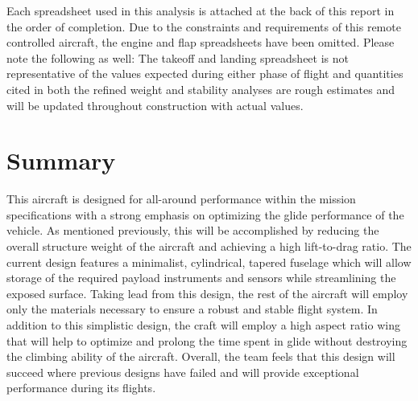 \documentclass[titlepage]{article}
\begin{document}
Each spreadsheet used in this analysis is attached at the back of this report in the order of completion. Due to the constraints and requirements of this remote controlled aircraft, the engine and flap spreadsheets have been omitted. Please note the following as well: The takeoff and landing spreadsheet is not representative of the values expected during either phase of flight and quantities cited in both the refined weight and stability analyses are rough estimates and will be updated throughout construction with actual values. 

\section{Summary}

This aircraft is designed for all-around performance within the mission specifications with a strong emphasis on optimizing the glide performance of the vehicle. As mentioned previously, this will be accomplished by reducing the overall structure weight of the aircraft and achieving a high lift-to-drag ratio. The current design features a minimalist, cylindrical, tapered fuselage which will allow storage of the required payload instruments and sensors while streamlining the exposed surface. Taking lead from this design, the rest of the aircraft will employ only the materials necessary to ensure a robust and stable flight system. In addition to this simplistic design, the craft will employ a high aspect ratio wing that will help to optimize and prolong the time spent in glide without destroying the climbing ability of the aircraft. Overall, the team feels that this design will succeed where previous designs have failed and will provide exceptional performance during its flights.

\newpage
\end{document}
